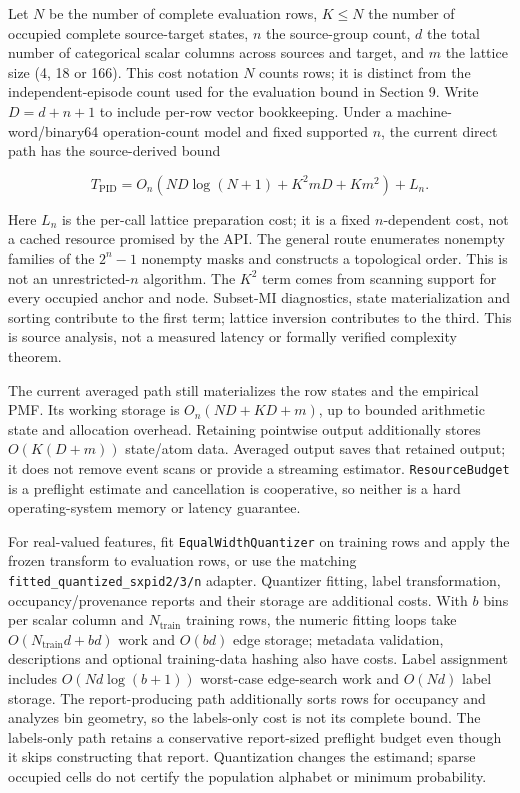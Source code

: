 \documentclass[11pt,a4paper]{article}
\newcounter{none}
\let\PidSavedTexttt\texttt
\renewcommand{\texttt}[1]{\PidSavedTexttt{#1}}
\begin{document}
Let \(N\) be the number of complete evaluation rows, \(K\leq N\) the number of occupied complete source-target states, \(n\) the source-group count, \(d\) the total number of categorical scalar columns across sources and target, and \(m\) the lattice size (4, 18 or 166). This cost notation \(N\) counts rows; it is distinct from the independent-episode count used for the evaluation bound in Section 9. Write \(D=d+n+1\) to include per-row vector bookkeeping. Under a machine-word/binary64 operation-count model and fixed supported \(n\), the current direct path has the source-derived bound

\[
T_{\mathrm{PID}}=O_n\!\left(ND\log(N+1)+K^2mD+Km^2\right)+L_n.
\]

Here \(L_n\) is the per-call lattice preparation cost; it is a fixed \(n\)-dependent cost, not a cached resource promised by the API. The general route enumerates nonempty families of the \(2^n-1\) nonempty masks and constructs a topological order. This is not an unrestricted-\(n\) algorithm. The \(K^2\) term comes from scanning support for every occupied anchor and node. Subset-MI diagnostics, state materialization and sorting contribute to the first term; lattice inversion contributes to the third. This is source analysis, not a measured latency or formally verified complexity theorem.

The current averaged path still materializes the row states and the empirical PMF. Its working storage is \(O_n(ND+KD+m)\), up to bounded arithmetic state and allocation overhead. Retaining pointwise output additionally stores \(O(K(D+m))\) state/atom data. Averaged output saves that retained output; it does not remove event scans or provide a streaming estimator. \texttt{ResourceBudget} is a preflight estimate and cancellation is cooperative, so neither is a hard operating-system memory or latency guarantee.

For real-valued features, fit \texttt{EqualWidthQuantizer} on training rows and apply the frozen transform to evaluation rows, or use the matching \texttt{fitted\_\allowbreak{}quantized\_\allowbreak{}sxpid2/\allowbreak{}3/\allowbreak{}n} adapter. Quantizer fitting, label transformation, occupancy/provenance reports and their storage are additional costs. With \(b\) bins per scalar column and \(N_{\mathrm{train}}\) training rows, the numeric fitting loops take \(O(N_{\mathrm{train}}d+bd)\) work and \(O(bd)\) edge storage; metadata validation, descriptions and optional training-data hashing also have costs. Label assignment includes \(O(Nd\log(b+1))\) worst-case edge-search work and \(O(Nd)\) label storage. The report-producing path additionally sorts rows for occupancy and analyzes bin geometry, so the labels-only cost is not its complete bound. The labels-only path retains a conservative report-sized preflight budget even though it skips constructing that report. Quantization changes the estimand; sparse occupied cells do not certify the population alphabet or minimum probability.
\end{document}
